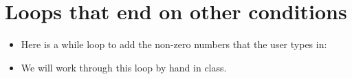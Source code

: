 \documentclass[letterpaper,10pt,english]{sphinxmanual}
\begin{document}
\section{Loops that end on other conditions}
\label{\detokenize{lecture_notes/lec09_loops1_while:loops-that-end-on-other-conditions}}\begin{itemize}
\item {} 
Here is a while loop to add the non-zero numbers that the user types
in:

\begin{sphinxVerbatim}[commandchars=\\\{\}]
  
  

  
      
       
          
          

\end{sphinxVerbatim}

\item {} 
We will work through this loop by hand in class.

\end{itemize}
\end{document}
